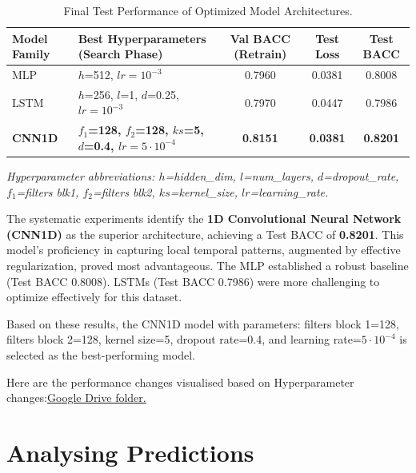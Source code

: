 \documentclass{article}
\begin{document}
\begin{table}[h!]
\centering
\caption{Final Test Performance of Optimized Model Architectures.}
\label{tab:model_comparison_final}
\begin{tabular}{@{}l p{6.0cm} c c c@{}} 
\toprule
Model Family & Best Hyperparameters (Search Phase) & Val BACC (Retrain) & Test Loss & Test BACC \\ \midrule
MLP    & $h$=512, $lr=10^{-3}$     & 0.7960 & 0.0381 & 0.8008 \\
LSTM   & $h$=256, $l$=1, $d$=0.25, $lr=10^{-3}$ & 0.7970 & 0.0447 & 0.7986 \\
\textbf{CNN1D} & \textbf{$f_1$=128, $f_2$=128, $ks$=5, $d$=0.4, $lr=5\cdot10^{-4}$} & \textbf{0.8151} & \textbf{0.0381} & \textbf{0.8201} \\ \bottomrule
\end{tabular}
\vspace{0.5em} 
\noindent \footnotesize{\textit{Hyperparameter abbreviations: $h$=hidden\_dim, $l$=num\_layers, $d$=dropout\_rate, $f_1$=filters blk1, $f_2$=filters blk2, $ks$=kernel\_size, $lr$=learning\_rate.}}
\end{table}

The systematic experiments identify the \textbf{1D Convolutional Neural Network (CNN1D)} as the superior architecture, achieving a Test BACC of \textbf{0.8201}. This model's proficiency in capturing local temporal patterns, augmented by effective regularization, proved most advantageous. The MLP established a robust baseline (Test BACC 0.8008). LSTMs (Test BACC 0.7986) were more challenging to optimize effectively for this dataset.

Based on these results, the CNN1D model with parameters: filters block 1=128, filters block 2=128, kernel size=5, dropout rate=0.4, and learning rate=$5 \cdot 10^{-4}$ is selected as the best-performing model.

Here are the performance changes visualised based on Hyperparameter changes:\href{https://drive.google.com/drive/folders/14WRL2o0_Zf722xxKuD7VffutwETS8ous?usp=sharing }{Google Drive folder.}

\section{Analysing Predictions}
\end{document}
